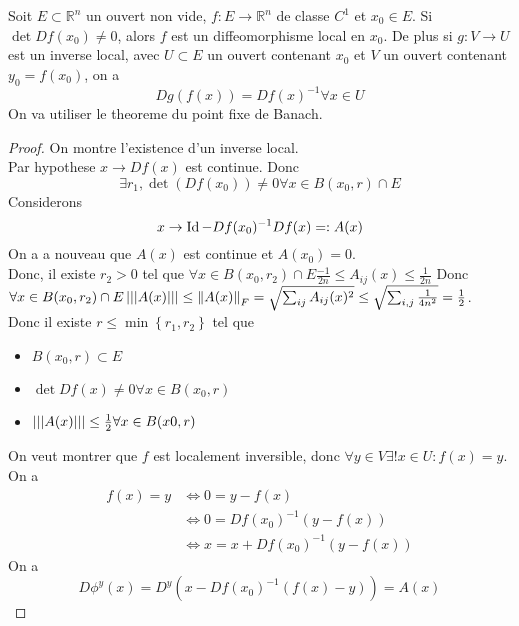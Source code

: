 \documentclass[../main.tex]{subfiles}
\begin{document}
					
\begin{thm}
	Soit $E \subset \mathbb{R}^n $ un ouvert non vide, $f: E \to \mathbb{R}^n$ de classe $C^1$ et $x_0\in E$. Si $\det Df( x_0) \neq 0$, alors $f$ est un diffeomorphisme local en $x_0$. De plus si $g: V \to U $ est un inverse local, avec $U \subset E$ un ouvert contenant $x_0$ et $V$ un ouvert contenant $y_0 = f( x_0) $, on a 
	\[ 
		D g( f( x) ) = Df( x) ^{-1} \forall x \in U	
	\]
	On va utiliser le theoreme du point fixe de Banach.
	
\end{thm}

\begin{proof}
On montre l'existence d'un inverse local.\\
Par hypothese $x \to Df( x) $ est continue. Donc
\[ 
	\exists r_1, \det ( Df( x_0) ) \neq 0 \forall x \in B( x_0,r) \cap E
\]
Considerons 
\[ 
	x \to \operatorname*{Id} - Df( x_0) ^{-1} Df( x) =: A( x) 
\]
On a a nouveau que $A( x) $ est continue et $A( x_0)=0 $.\\
Donc, il existe $r_2>0$ tel que $\forall x\in B( x_0,r_2)  \cap E \frac{-1}{2n} \leq A_{ij} ( x) \leq \frac{1}{2n}$
Donc $\forall x \in B( x_0,r_2) \cap E \left\vert\left\vert\left\vert A( x) \right\vert\right\vert\right\vert \leq \left\lVert A( x) \right\rVert _F = \sqrt{ \sum_{ij} A_{ij} ( x) ^{2}}\leq  \sqrt{ \sum_{i,j}  \frac{1}{4 n^{2}}} = \frac{1}{2} $.\\
Donc il existe $r \leq \min \left\{ r_1,r_2 \right\} $ tel que
\begin{itemize}
	\item $B( x_0,r) \subset E $
	\item $\det Df( x) \neq 0\forall x \in B( x_0,r) $ 
	\item $\left\vert\left\vert\left\vert A( x) \right\vert\right\vert\right\vert \leq \frac{1}{2}\forall x \in B( x0,r) $
\end{itemize}
On veut montrer que $f$ est localement inversible, donc $\forall y \in V \exists ! x \in U: f(x ) = y $.\\
On a
\begin{align*}
	f( x) = y &\iff 0 = y - f( x) \\
		  &\iff 0 = Df(x_0 ) ^{-1} ( y- f( x) ) \\
		  &\iff x= x + D f( x_0) ^{-1} ( y -f( x) ) 
\end{align*}
On a 
\[ 
	D \phi^{y}( x)  = D^{y}( x - Df( x_0) ^{-1}( f( x) -y) ) = A( x) 
\]


\end{proof}
\end{document}
